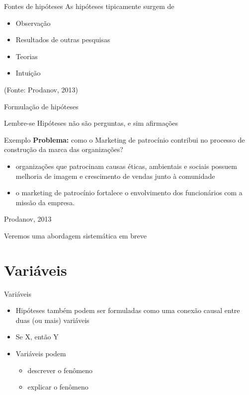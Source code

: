 \documentclass{beamer}
\begin{document}
\begin{frame}{Fontes de hipóteses}
  As hipóteses tipicamente surgem de
  \bigskip
  \begin{itemize}
    \footnotesize
  \item Observação
    \medskip
  \item Resultados de outras pesquisas
    \medskip
  \item Teorias
    \medskip
  \item Intuição
  \end{itemize}

  \vfill
  \scriptsize
  \hfill (Fonte: Prodanov, 2013)
\end{frame}

\begin{frame}{Formulação de hipóteses}
  \begin{block}{Lembre-se}
    Hipóteses não são perguntas, e sim afirmações
  \end{block}

  \begin{exampleblock}{Exemplo}
    \footnotesize
    {\bf Problema:} como o Marketing de patrocínio
    contribui no processo de construção da marca das organizações?

    \begin{itemize}
      \scriptsize
    \item organizações que patrocinam causas éticas, ambientais e
      sociais possuem melhoria de imagem e crescimento de vendas junto
      à comunidade
    \item o marketing de patrocínio fortalece o envolvimento dos
      funcionários com a missão da empresa.
    \end{itemize}

    \vfill
    \scriptsize
    \hfill Prodanov, 2013
  \end{exampleblock}
\end{frame}

\begin{frame}
  \begin{center}
    Veremos uma abordagem sistemática em breve
  \end{center}
\end{frame}

\section{Variáveis}

\begin{frame}{Variáveis}
  \begin{itemize}
    \footnotesize
  \item Hipóteses também podem ser formuladas como uma conexão causal
    entre duas (ou mais) variáveis
    \bigskip
  \item Se X, então Y
    \bigskip
  \item Variáveis podem
    \begin{itemize}
      \scriptsize
    \item descrever o fenômeno
    \item explicar o fenômeno
    \end{itemize}
  \end{itemize}
\end{frame}
\end{document}
